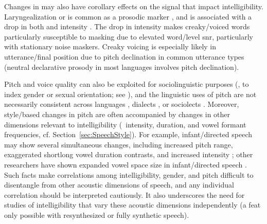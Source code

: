 Changes in \fo{} may also have corollary effects on the signal that impact intelligibility.  Laryngealization or  is common as a prosodic marker \citep{Lehiste1979, Kreiman1982, DilleyEtAl1996}, and is associated with a drop in both \fo{} and intensity \citep{GordonLadefoged2001}.  The drop in intensity makes creaky\-/voiced words particularly susceptible to masking due to elevated word\-/level \ac{snr}, particularly with stationary noise maskers.  Creaky voicing is especially likely in utterance\-/final position due to pitch declination in common utterance types (neutral declarative prosody in most languages involves pitch declination).

Pitch and voice quality can also be exploited for sociolinguistic purposes (\eg, to index gender or sexual orientation; see \citealt[\intal]{McconnellGinet1978, Gaudio1994, Podesva2011}), and the linguistic uses of pitch are not necessarily consistent across languages \citep{MajewskiEtAl1972, Todaka1993, Yuasa2008, KeatingKuo2012}, dialects \citep{GrabePost2002, ClopperSmiljanic2011}, or sociolects \citep{McLemore1991, Britain2008}.  %
Moreover, style\-/based changes in pitch are often accompanied by changes in other dimensions relevant to intelligibility (\viz\ intensity, duration, and vowel formant frequencies, cf. Section~\ref{sec:SpeechStyle}).  For example, infant\-/directed speech may show several simultaneous changes, including increased pitch range, exaggerated short\slsh long vowel duration contrasts, and increased intensity \citep{WassinkEtAl2007}; other researchers have shown expanded vowel space size in infant\-/directed speech \citep{KuhlEtAl1997}.  Such facts make correlations among intelligibility, gender, and pitch difficult to disentangle from other acoustic dimensions of speech, and any individual correlation should be interpreted cautiously.  It also underscores the need for studies of intelligibility that vary these acoustic dimensions independently (a feat only possible with resynthesized or fully synthetic speech).

